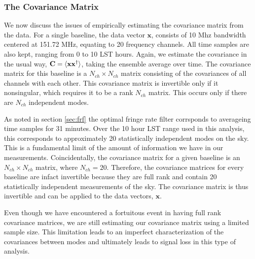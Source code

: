 \documentclass[twocolumn,numberedappendix]{emulateapj} \shorttitle{PSA64}
\newcommand{\x}{\mathbf{x}} \newcommand{\xhat}{\hat{\mathbf{x}}}
\newcommand{\C}{\mathbf{C}} \newcommand{\Q}{\mathbf{Q}}
\begin{document}
\subsubsection{The Covariance Matrix}
%

We now discuss the issues of empirically estimating the covariance matrix from
the data. For a single baseline, the data vector $\x$, consists of 10 Mhz
bandwidth centered at 151.72 MHz, equating to 20 frequency channels.
All time samples are also kept, ranging from 0 to 10 LST hours. Again, we
estimate the covariance in the usual way, $\C = \expval{\x\x^{\dagger}}$, taking
the ensemble average over time. The covariance matrix for this baseline is a
$N_{ch}\times N_{ch}$ matrix consisting of the covariances of all channels with
each other. This covariance matrix is invertible only if it nonsingular, which
requires it to be a rank $N_{ch}$ matrix. This occurs only if there are $N_{ch}$
independent modes. 

As noted in section \ref{sec:frf} the optimal fringe rate filter corrsponds to
averageing time samples for 31 minutes. Over the 10 hour LST range used in this
analysis, this corresponds to approximately 20 statistically independent modes
on the sky. This is a fundamental limit of the amount of information we have in
our measurements. Coincidentally, the covariance matrix for a given baseline is
an $N_{ch} \times N_{ch}$ matrix, where $N_{ch}=20$.  Therefore, the covariance
matrices for every baseline are infact invertible because they are full rank 
and contain 20 statistically independent measurements of the sky. The covariance
matrix is thus invertible and can be applied to the data vectors, $\x$. 

%
Even though we have encountered a fortuitous event in having full rank
covariance matrices, we are still estimating our covariance matrix using a
limited sample size. This limitation leads to an imperfect characterization of
the covariances between modes and ultimately leads to signal loss in this type
of analysis. 
\end{document}
